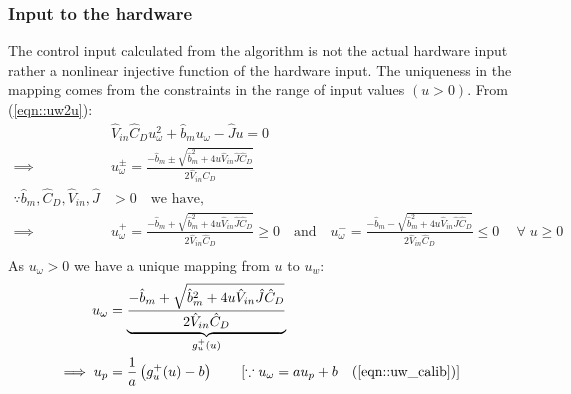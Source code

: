 \subsubsection{Input to the hardware}
The control input calculated from the algorithm is not the actual hardware
input rather a nonlinear injective function of the hardware input. The
uniqueness in the mapping comes from the constraints in the range of input
values $(u > 0)$. From (\ref{eqn::uw2u}):
\begin{align*}
    &\hat V_{in} \hat C_D u_{\omega}^2 + \hat b_m u_\omega - \hat J u = 0\\
    \implies& u^{\pm}_\omega = \frac{-\hat b_m \pm \sqrt{\hat b_m ^2 + 4u \hat V_{in} \hat J \hat C_D}}{2 \hat V_{in} C_D}\\
    \because \hat b_m, \hat C_D, \hat V_{in}, \hat J &> 0 \quad \text{we have, }\qquad \\
    \implies& u^{+}_\omega = \frac{-\hat b_m + \sqrt{\hat b_m ^2 + 4u \hat V_{in} \hat J \hat C_D}}{2 \hat V_{in} \hat C_D} \geq 0 \quad \text{and} \quad
    u^{-}_\omega = \frac{-\hat b_m - \sqrt{\hat b_m ^2 + 4u \hat V_{in} \hat J  \hat C_D}}{2 \hat V_{in} \hat C_D} \leq 0 \quad \
    \forall \; u \geq 0 \\
\end{align*}
As $u_\omega > 0$ we have a unique mapping from $u$ to $u_w$:
\begin{align}
    u_\omega &= \underbrace{\frac{-\hat b_m + \sqrt{\hat b_m ^2 + 4u \hat V_{in} \hat J \hat C_D}}{2 \hat V_{in} \hat C_D}}_{g_u^+(u)}
    \label{eqn::u2uw}\\
    \implies u_p &= \frac{1}{a} \left( g_u^+(u) - b \right) \qquad [\because u_\omega = a u_p + b \quad (\ref{eqn::uw_calib})]
\end{align}
